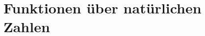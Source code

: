 
\chapter{Funktionen über natürlichen Zahlen}
\label{cha:recursion-numbers}

\label{sec:factorial}

